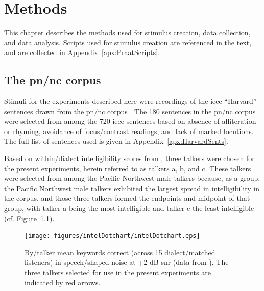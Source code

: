 \chapter{Methods\label{chap:Methods}}

This chapter describes the methods used for stimulus creation, data collection, and data analysis.  Scripts used for stimulus creation are referenced in the text, and are collected in Appendix~\ref{apx:PraatScripts}.%

\section{The \ac{pn/nc} corpus}
Stimuli for the experiments described here were recordings of the \ac{ieee} “Harvard” sentences \citep{HarvardSents} drawn from the \ac{pn/nc} corpus \citep{xxx}.  The 180 sentences in the \ac{pn/nc} corpus were selected from among the 720 \ac{ieee} sentences based on absence of alliteration or rhyming, avoidance of focus/contrast readings, and lack of marked locutions.  The full list of sentences used is given in Appendix~\ref{apx:HarvardSents}.  

Based on within\-/dialect intelligibility scores from \citet{McCloyEtAl2013}, three talkers were chosen for the present experiments, herein referred to as talkers \ac{a}, \ac{b}, and \ac{c}.  These talkers were selected from among the Pacific Northwest male talkers because, as a group, the Pacific Northwest male talkers exhibited the largest spread in intelligibility in the corpus, and those three talkers formed the endpoints and midpoint of that group, with talker \ac{a} being the most intelligible and talker \ac{c} the least intelligible (cf. Figure~\ref{fig:dotchart}).

\begin{figure}
	\begin{centering}
	\texttt{[image: figures/intelDotchart/intelDotchart.eps]}
	\caption[Intelligibility of talkers used to make the stimuli]{By\-/talker mean keywords correct (across 15 dialect\-/matched listeners) in speech\-/shaped noise at +2 dB \ac{snr} (data from \citealt{McCloyEtAl2013}).  The three talkers selected for use in the present experiments are indicated by red arrows.\label{fig:dotchart}}
	\end{centering}
\end{figure}


